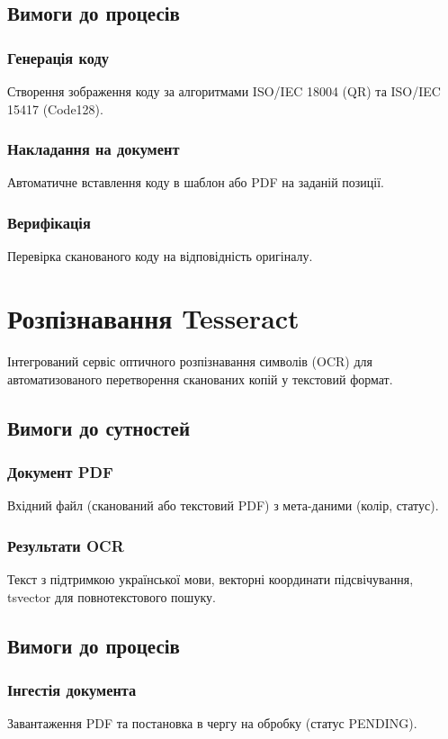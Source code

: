 \documentclass{article}
\begin{document}
\subsection{Вимоги до процесів}
\subsubsection{Генерація коду}
Створення зображення коду за алгоритмами ISO/IEC 18004 (QR) та ISO/IEC 15417 (Code128).

\subsubsection{Накладання на документ}
Автоматичне вставлення коду в шаблон або PDF на заданій позиції.

\subsubsection{Верифікація}
Перевірка сканованого коду на відповідність оригіналу.

\newpage
\section{Розпізнавання Tesseract}
Інтегрований сервіс оптичного розпізнавання символів (OCR) для автоматизованого перетворення сканованих копій у текстовий формат.

\subsection{Вимоги до сутностей}
\subsubsection{Документ PDF}
Вхідний файл (сканований або текстовий PDF) з мета-даними (колір, статус).

\subsubsection{Результати OCR}
Текст з підтримкою української мови, векторні координати підсвічування, tsvector для повнотекстового пошуку.

\subsection{Вимоги до процесів}
\subsubsection{Інгестія документа}
Завантаження PDF та постановка в чергу на обробку (статус PENDING).
\end{document}
